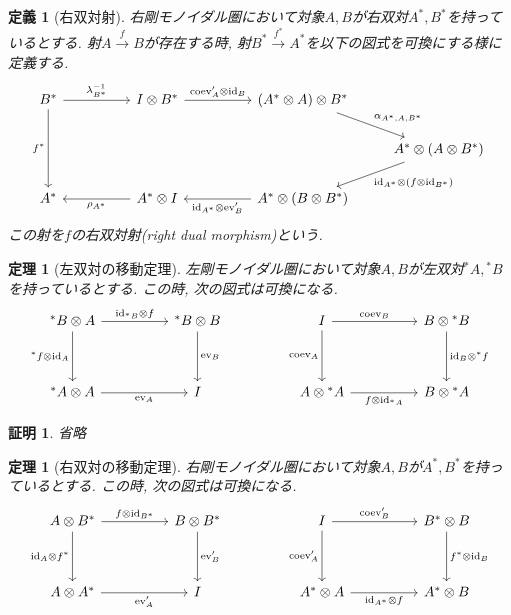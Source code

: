 \documentclass[a4paper,12pt]{ltjsarticle}
\theoremstyle{break}
\newtheorem{defn}[thm]{定義}
\newtheorem{thrm}[thm]{定理}
\newtheorem*{prf}{証明}
\newcommand{\xr}[1]{\xrightarrow{#1}}
\newcommand{\id}{\mathrm{id}}
\newcommand{\eva}{\mathrm{ev}}
\newcommand{\coev}{\mathrm{coev}}
\newcommand{\al}{\alpha}
\newcommand{\la}{\lambda}
\newcommand{\ot}{\otimes}
\numberwithin{equation}{section}
\begin{document}
\begin{defn}[右双対射]
  右剛モノイダル圏において対象$A,B$が右双対$A^*,B^*$を持っているとする. 
  射$A \xr{f} B$が存在する時, 射$B^* \xr{f^*} A^*$を以下の図式を可換にする様に定義する. 
  \[\begin{tikzcd}
    {B^*} && {I \ot B^*} && {(A^* \ot A) \ot B^*} \\
    &&&&& {A^* \ot (A \ot B^*)} \\
    {A^*} && {A^* \ot I} && {A^* \ot (B \ot B^*)}
    \arrow["{\coev'_A \ot \id_B}", from=1-3, to=1-5]
    \arrow["{\al_{A^*,A,B^*}}", from=1-5, to=2-6]
    \arrow["{\id_{A^*} \ot (f \ot \id_{B^*})}", from=2-6, to=3-5]
    \arrow["{\id_{A^*} \ot \eva'_B}", from=3-5, to=3-3]
    \arrow["{\la_{B^*}^{-1}}", from=1-1, to=1-3]
    \arrow["{f^*}"', from=1-1, to=3-1]
    \arrow["{\rho_{A^*}}", from=3-3, to=3-1]
  \end{tikzcd}\]
  この射を$f$の右双対射(right dual morphism)という. 
\end{defn}

\begin{thrm}[左双対の移動定理]
  左剛モノイダル圏において対象$A,B$が左双対${}^*A,{}^*B$を持っているとする. 
  この時, 次の図式は可換になる. 
  \[\begin{tikzcd}
    {{}^*B \ot A} && {{}^*B \ot B} && I && {B \ot {}^*B} \\
    \\
    {{}^*A \ot A} && I && {A \ot {}^*A} && {B \ot {}^*A}
    \arrow["{\id_{{}^*B} \ot f}", from=1-1, to=1-3]
    \arrow["{{}^*f \ot \id_A}"', from=1-1, to=3-1]
    \arrow["{\eva_A}"', from=3-1, to=3-3]
    \arrow["{\eva_B}", from=1-3, to=3-3]
    \arrow["{\coev_B}", from=1-5, to=1-7]
    \arrow["{\coev_A}"', from=1-5, to=3-5]
    \arrow["{f \ot \id_{{}^*A}}"', from=3-5, to=3-7]
    \arrow["{\id_B \ot {}^*f}", from=1-7, to=3-7]
  \end{tikzcd}\]
\end{thrm}

\begin{prf}
  省略
\end{prf}

\begin{thrm}[右双対の移動定理]
  右剛モノイダル圏において対象$A,B$が$A^*,B^*$を持っているとする. 
  この時, 次の図式は可換になる.  
  \[\begin{tikzcd}
    {A \ot B^*} && {B \ot B^*} && I && {B^* \ot B} \\
    \\
    {A \ot A^*} && I && {A^* \ot A} && {A^* \ot B}
    \arrow["{f \ot \id_{B^*}}", from=1-1, to=1-3]
    \arrow["{\id_A \ot f^*}"', from=1-1, to=3-1]
    \arrow["{\eva'_A}"', from=3-1, to=3-3]
    \arrow["{\eva'_B}", from=1-3, to=3-3]
    \arrow["{\coev'_B}", from=1-5, to=1-7]
    \arrow["{\coev'_A}"', from=1-5, to=3-5]
    \arrow["{\id_{A^*} \ot f}"', from=3-5, to=3-7]
    \arrow["{f^* \ot \id_B}", from=1-7, to=3-7]
  \end{tikzcd}\]
\end{thrm}
\end{document}
